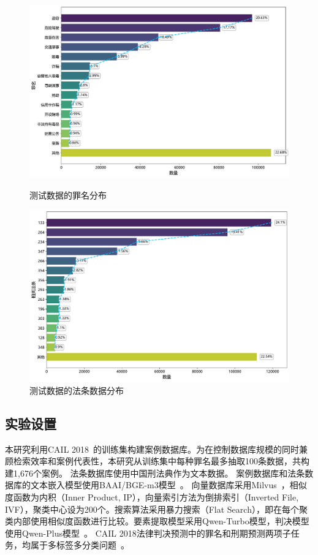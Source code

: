 \begin{figure}[!htbp]
	\begin{minipage}{0.5\linewidth}
		\centering
		\includegraphics[width=1\linewidth]{fig/accusation_distribution.pdf}
		\caption{测试数据的罪名分布}
		\label{fig:art_dis}
	\end{minipage}
	\begin{minipage}{0.5\linewidth}
		\centering
		\includegraphics[width=1\linewidth]{fig/article_distribution.pdf}
		\caption{测试数据的法条数据分布}
		\label{fig:acc_dis}
	\end{minipage}
\end{figure}
\subsection{\heiti 实验设置}
本研究利用CAIL 2018~\cite{xiao2018cail2018largescalelegaldataset}的训练集构建案例数据库。为在控制数据库规模的同时兼顾检索效率和案例代表性，本研究从训练集中每种罪名最多抽取100条数据，共构建1,676个案例。
法条数据库使用中国刑法典作为文本数据。
案例数据库和法条数据库的文本嵌入模型使用BAAI/BGE-m3模型~\cite{chenBGEM3EmbeddingMultiLingual2024}。
向量数据库采用Milvus~\cite{2022manu,2021milvus}，相似度函数为内积（Inner Product, IP），向量索引方法为倒排索引（Inverted File, IVF），聚类中心设为200个。搜索算法采用暴力搜索（Flat Search），即在每个聚类内部使用相似度函数进行比较。要素提取模型采用Qwen-Turbo模型，判决模型使用Qwen-Plus模型~\cite{qwenQwen25TechnicalReport2025}。
CAIL 2018法律判决预测中的罪名和刑期预测两项子任务，均属于多标签多分类问题~\cite{xiao2018cail2018}。


